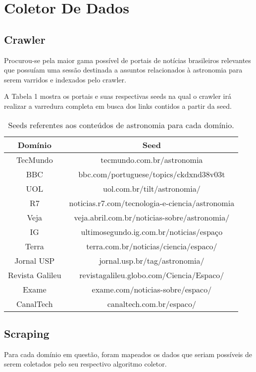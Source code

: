 
\section{Coletor De Dados}

\subsection{Crawler}
Procurou-se pela maior gama possível de portais de notícias brasileiros relevantes que possuíam uma sessão destinada a assuntos relacionados à astronomia para serem varridos e indexados pelo crawler.

A Tabela 1 mostra os portais e suas respectivas seeds na qual o crawler irá realizar a varredura completa em busca dos links contidos a partir da seed.


\begin{table}
\begin{tabular}{|c|c|}
\hline
Domínio & Seed\\\hline
TecMundo & tecmundo.com.br/astronomia \\\hline
BBC & bbc.com/portuguese/topics/ckdxnd38v03t\\\hline
UOL & uol.com.br/tilt/astronomia/\\\hline
R7 & noticias.r7.com/tecnologia-e-ciencia/astronomia \\\hline
Veja & veja.abril.com.br/noticias-sobre/astronomia/ \\\hline
IG & ultimosegundo.ig.com.br/noticias/espaço \\\hline
Terra & terra.com.br/noticias/ciencia/espaco/\\\hline
Jornal USP & jornal.usp.br/tag/astronomia/\\\hline
Revista Galileu & revistagalileu.globo.com/Ciencia/Espaco/\\\hline
Exame & exame.com/noticias-sobre/espaco/\\\hline
CanalTech & canaltech.com.br/espaco/\\\hline
\end{tabular}
\caption{Seeds referentes aos conteúdos de astronomia para cada domínio.}
\end{table}


\subsection{Scraping}
Para cada domínio em questão, foram mapeados os dados que seriam possíveis de serem coletados pelo seu respectivo algoritmo coletor.
 

